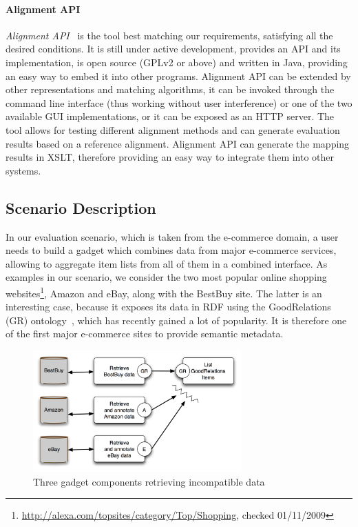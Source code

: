 \paragraph{Alignment API} \emph{Alignment API}~\cite{euzenat2004api} is the tool best matching our requirements, satisfying all the desired conditions. It is still under active development, provides an API and its implementation, is open source (GPLv2 or above) and written in Java, providing an easy way to embed it into other programs. Alignment API can be extended by other representations and matching algorithms, it can be invoked through the command line interface (thus working without user interference) or one of the two available GUI implementations, or it can be exposed as an HTTP server. The tool allows for testing different alignment methods and can generate evaluation results based on a reference alignment. Alignment API can generate the mapping results in XSLT, therefore providing an easy way to integrate them into other systems.

\subsection{Scenario Description}
\label{scenario}

In our evaluation scenario, which is taken from the e-commerce domain, a user needs to build a gadget which combines data from major e-commerce services, allowing to aggregate item lists from all of them in a combined interface.
As examples in our scenario, we consider the two most popular online shopping websites\footnote{\url{http://alexa.com/topsites/category/Top/Shopping}, checked 01/11/2009}, Amazon and eBay, along with the BestBuy site. The latter is an interesting case, because it exposes its data in RDF using the GoodRelations (GR) ontology~\cite{hepp-goodrelations}, which has recently gained a lot of popularity. It is therefore one of the first major e-commerce sites to provide semantic metadata.

\begin{figure}
    \centering
        \includegraphics[width=8cm]{images/screens_diagram.png}%
        \caption{Three gadget components retrieving incompatible data}
    \label{fig:screens}
\end{figure}

